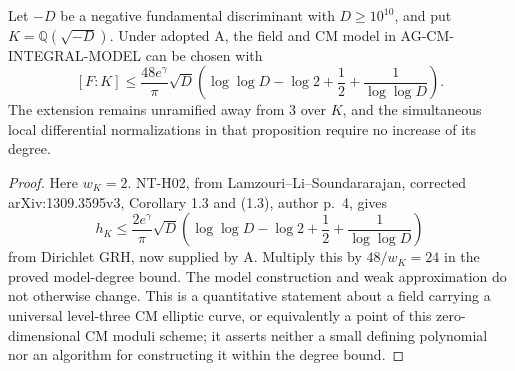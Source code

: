 \begin{proposition}
Let $-D$ be a negative fundamental discriminant with
$D\ge10^{10}$, and put $K=\mathbb Q(\sqrt{-D})$.
Under adopted A, the field and CM model in
AG-CM-INTEGRAL-MODEL can be chosen with
\[
 [F:K]\le\frac{48e^\gamma}{\pi}\sqrt D
    \left(\log\log D-\log2+\frac12+
                         \frac1{\log\log D}\right).
\]
The extension remains unramified away from $3$ over $K$,
and the simultaneous local differential normalizations in
that proposition require no increase of its degree.
\end{proposition}
\begin{proof}
Here $w_K=2$. NT-H02, from Lamzouri--Li--Soundararajan,
corrected arXiv:1309.3595v3, Corollary 1.3 and (1.3),
author p.~4, gives
\[
 h_K\le\frac{2e^\gamma}{\pi}\sqrt D
    \left(\log\log D-\log2+\frac12+
                         \frac1{\log\log D}\right)
\]
from Dirichlet GRH, now supplied by A.
Multiply this by $48/w_K=24$ in the proved model-degree
bound. The model construction and weak approximation do
not otherwise change. This is a quantitative statement about
a field carrying a universal level-three CM elliptic curve,
or equivalently a point of this zero-dimensional CM moduli
scheme; it asserts neither a small defining polynomial nor
an algorithm for constructing it within the degree bound.
\end{proof}

